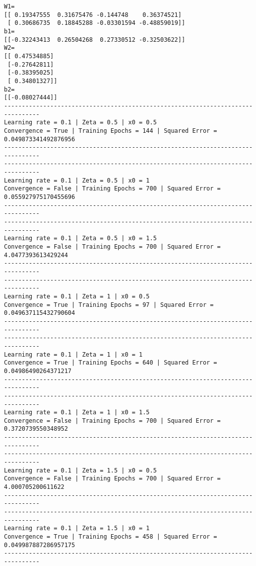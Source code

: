 \documentclass[11pt]{article}
\begin{document}
    \begin{Verbatim}[commandchars=\\\{\}]
W1=
[[ 0.19347555  0.31675476 -0.144748    0.36374521]
 [ 0.30686735  0.18845288 -0.03301594 -0.48859019]]
b1=
[[-0.32243413  0.26504268  0.27330512 -0.32503622]]
W2=
[[ 0.47534885]
 [-0.27642811]
 [-0.38395025]
 [ 0.34801327]]
b2=
[[-0.08027444]]
--------------------------------------------------------------------------------
Learning rate = 0.1 | Zeta = 0.5 | x0 = 0.5
Convergence = True | Training Epochs = 144 | Squared Error =
0.049873341492876956
--------------------------------------------------------------------------------
--------------------------------------------------------------------------------
Learning rate = 0.1 | Zeta = 0.5 | x0 = 1
Convergence = False | Training Epochs = 700 | Squared Error =
0.055927975170455696
--------------------------------------------------------------------------------
--------------------------------------------------------------------------------
Learning rate = 0.1 | Zeta = 0.5 | x0 = 1.5
Convergence = False | Training Epochs = 700 | Squared Error = 4.0477393613429244
--------------------------------------------------------------------------------
--------------------------------------------------------------------------------
Learning rate = 0.1 | Zeta = 1 | x0 = 0.5
Convergence = True | Training Epochs = 97 | Squared Error = 0.049637115432790604
--------------------------------------------------------------------------------
--------------------------------------------------------------------------------
Learning rate = 0.1 | Zeta = 1 | x0 = 1
Convergence = True | Training Epochs = 640 | Squared Error = 0.04986490264371217
--------------------------------------------------------------------------------
--------------------------------------------------------------------------------
Learning rate = 0.1 | Zeta = 1 | x0 = 1.5
Convergence = False | Training Epochs = 700 | Squared Error = 0.3720739550348952
--------------------------------------------------------------------------------
--------------------------------------------------------------------------------
Learning rate = 0.1 | Zeta = 1.5 | x0 = 0.5
Convergence = False | Training Epochs = 700 | Squared Error = 4.000705200611622
--------------------------------------------------------------------------------
--------------------------------------------------------------------------------
Learning rate = 0.1 | Zeta = 1.5 | x0 = 1
Convergence = True | Training Epochs = 458 | Squared Error =
0.049987887286957175
--------------------------------------------------------------------------------

\end{Verbatim}
\end{document}
